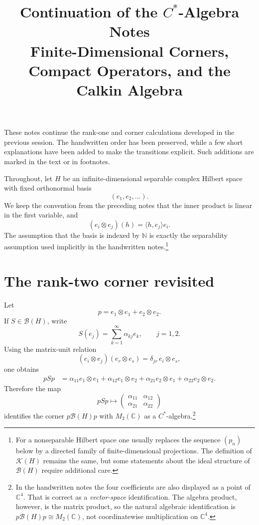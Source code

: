 \documentclass[11pt]{article}
\title{Continuation of the $C^*$-Algebra Notes\\Finite-Dimensional Corners, Compact Operators, and the Calkin Algebra}
\author{}
\date{}
\newcommand{\C}{\mathbb{C}}
\newcommand{\N}{\mathbb{N}}
\newcommand{\BH}{\mathcal{B}(H)}
\newcommand{\KH}{\mathcal{K}(H)}
\begin{document}
\maketitle

\noindent
These notes continue the rank-one and corner calculations developed in the previous
session.  The handwritten order has been preserved, while a few short explanations
have been added to make the transitions explicit.  Such additions are marked in the
text or in footnotes.

Throughout, let $H$ be an infinite-dimensional separable complex Hilbert space with
fixed orthonormal basis
\[
(e_1,e_2,\ldots).
\]
We keep the convention from the preceding notes that the inner product is linear in
the first variable, and
\[
(e_i\otimes e_j)(h)=\langle h,e_j\rangle e_i.
\]
The assumption that the basis is indexed by $\N$ is exactly the separability assumption
used implicitly in the handwritten notes.\footnote{For a nonseparable Hilbert space one
usually replaces the sequence $(p_n)$ below by a directed family of finite-dimensional
projections.  The definition of $\KH$ remains the same, but some statements about the
ideal structure of $\BH$ require additional care.}

\section{The rank-two corner revisited}

Let
\[
p=e_1\otimes e_1+e_2\otimes e_2.
\]
If $S\in\BH$, write
\[
S(e_j)=\sum_{k=1}^{\infty}\alpha_{kj}e_k,
\qquad j=1,2.
\]
Using the matrix-unit relation
\[
(e_i\otimes e_j)(e_r\otimes e_s)
 =\delta_{jr}\,e_i\otimes e_s,
\]
one obtains
\begin{align*}
pSp
&=\alpha_{11}e_1\otimes e_1
 +\alpha_{12}e_1\otimes e_2
 +\alpha_{21}e_2\otimes e_1
 +\alpha_{22}e_2\otimes e_2.
\end{align*}
Therefore the map
\[
pSp\longmapsto
\begin{pmatrix}
\alpha_{11}&\alpha_{12}\\
\alpha_{21}&\alpha_{22}
\end{pmatrix}
\]
identifies the corner $p\BH p$ with $M_2(\C)$ as a $C^*$-algebra.\footnote{In the
handwritten notes the four coefficients are also displayed as a point of $\C^4$.
That is correct as a \emph{vector-space} identification.  The algebra product,
however, is the matrix product, so the natural algebraic identification is
$p\BH p\cong M_2(\C)$, not coordinatewise multiplication on $\C^4$.}
\end{document}
